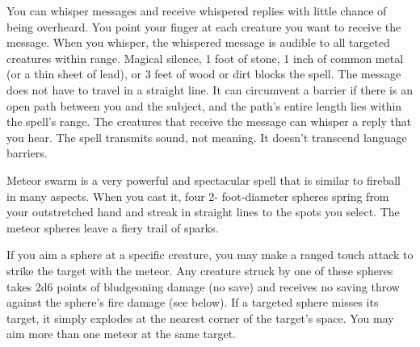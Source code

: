 \begin{multicols}{2}
\begin{small}
\noindent You can whisper messages and receive whispered replies with little chance of being overheard. You point your finger at each creature you want to receive the message. When you whisper, the whispered message is audible to all targeted creatures within range. Magical silence, 1 foot of stone, 1 inch of common metal (or a thin sheet of lead), or 3 feet of wood or dirt blocks the spell. The message does not have to travel in a straight line. It can circumvent a barrier if there is an open path between you and the subject, and the path's entire length lies within the spell's range. The creatures that receive the message can whisper a reply that you hear. The spell transmits sound, not meaning. It doesn't transcend language barriers.


\noindent Meteor swarm is a very powerful and spectacular spell that is similar to fireball in many aspects. When you cast it, four 2- foot-diameter spheres spring from your outstretched hand and streak in straight lines to the spots you select. The meteor spheres leave a fiery trail of sparks.

\smallskip\noindent If you aim a sphere at a specific creature, you may make a ranged touch attack to strike the target with the meteor. Any creature struck by one of these spheres takes 2d6 points of bludgeoning damage (no save) and receives no saving throw against the sphere's fire damage (see below). If a targeted sphere misses its target, it simply explodes at the nearest corner of the target's space. You may aim more than one meteor at the same target.


\end{small}
\end{multicols}
